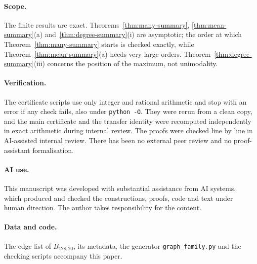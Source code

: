 \documentclass[11pt,a4paper]{article}
\theoremstyle{definition}
\theoremstyle{remark}
\begin{document}
\paragraph{Scope.} The finite results are exact. Theorems~\ref{thm:many-summary}, \ref{thm:mean-summary}(a) and~\ref{thm:degree-summary}(i) are asymptotic; the order at which Theorem~\ref{thm:many-summary} starts is checked exactly, while Theorem~\ref{thm:mean-summary}(a) needs very large orders. Theorem~\ref{thm:degree-summary}(iii) concerns the position of the maximum, not unimodality.

\paragraph{Verification.} The certificate scripts use only integer and rational arithmetic and stop with an error if any check fails, also under \texttt{python -O}. They were rerun from a clean copy, and the main certificate and the transfer identity were recomputed independently in exact arithmetic during internal review. The proofs were checked line by line in AI-assisted internal review. There has been no external peer review and no proof-assistant formalisation.

\paragraph{AI use.} This manuscript was developed with substantial assistance from AI systems, which produced and checked the constructions, proofs, code and text under human direction. The author takes responsibility for the content.

\paragraph{Data and code.} The edge list of $B_{128,20}$, its metadata, the generator \texttt{graph\_family.py} and the checking scripts accompany this paper.
\end{document}
